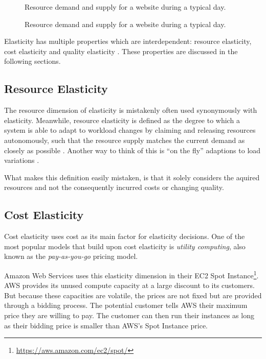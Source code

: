 \begin{figure}[ht]
    \centering
    
    \caption{Resource demand and supply for a website during a typical day.}
    \label{fig:elasticity-application-no-scaling}
\end{figure}

\begin{figure}[ht]
    \centering
    
    \caption{Resource demand and supply for a website during a typical day.}
    \label{fig:elasticity-application-scaling}
\end{figure}

Elasticity has multiple properties which are interdependent: resource elasticity, cost elasticity and quality elasticity \cite{dustdarPrinciplesElasticProcesses2011}. These properties are discussed in the following sections.

\subsection{Resource Elasticity}

The resource dimension of elasticity is mistakenly often used synonymously with elasticity. Meanwhile, resource elasticity is defined as the degree to which a system is able to adapt to workload changes by claiming and releasing resources autonomously, such that the resource supply matches the current demand as closely as possible \cite{herbstElasticityCloudComputing2013}. Another way to think of this is ``on the fly'' adaptions to load variations \cite{al-dhuraibiElasticityCloudComputing2018}.

What makes this definition easily mistaken, is that it solely considers the aquired resources and not the consequently incurred costs or changing quality.

\subsection{Cost Elasticity}

Cost elasticity uses cost as its main factor for elasticity decisions. One of the most popular models that build upon cost elasticity is \textit{utility computing}, also known as the \textit{pay-as-you-go} pricing model.

Amazon Web Services uses this elasticity dimension in their EC2 Spot Instance\footnote{\url{https://aws.amazon.com/ec2/spot/}}. AWS provides its unused compute capacity at a large discount to its customers. But because these capacities are volatile, the prices are not fixed but are provided through a bidding process. The potential customer tells AWS their maximum price they are willing to pay. The customer can then run their instances as long as their bidding price is smaller than AWS's Spot Instance price.

